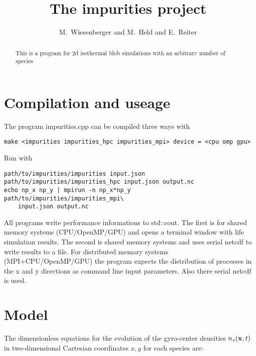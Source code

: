 


\usepackage{minted}
\newcommand{\ns}{\ensuremath{{n_s} }}
\newcommand{\physs}{\ensuremath{{N_s} }}



\title{The impurities project}
\author{ M.~Wiesenberger and M.~Held and E.~Reiter}
\maketitle

\begin{abstract}
  This is a program for 2d isothermal blob simulations with an arbitrary number of species
\end{abstract}
\tableofcontents

\section{Compilation and useage}
The program impurities.cpp can be compiled three ways with
\begin{verbatim}
make <impurities impurities_hpc impurities_mpi> device = <cpu omp gpu>
\end{verbatim}
Run with
\begin{verbatim}
path/to/impurities/impurities input.json
path/to/impurities/impurities_hpc input.json output.nc
echo np_x np_y | mpirun -n np_x*np_y path/to/impurities/impurities_mpi\
    input.json output.nc
\end{verbatim}
All programs write performance informations to std::cout.
The first is for shared memory systems (CPU/OpenMP/GPU) and opens a terminal window with life simulation results.
 The
second is shared memory systems and uses serial netcdf
to write results to a file.
For distributed
memory systems (MPI+CPU/OpenMP/GPU) the program expects the distribution of processes in the
x and y directions as command line input parameters. Also there serial netcdf is used.

\section{Model}

The dimensionless equations for the evolution of the gyro-center
densities $\ns({\bf x},t)$ in two-dimensional Cartesian coordinates $x,y$ for each species are:

